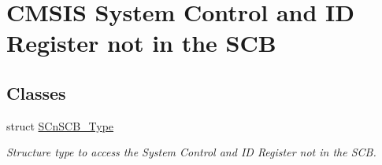 \hypertarget{group___c_m_s_i_s___s_cn_s_c_b}{\section{C\-M\-S\-I\-S System Control and I\-D Register not in the S\-C\-B}
\label{group___c_m_s_i_s___s_cn_s_c_b}
}
\subsection*{Classes}
\begin{DoxyCompactItemize}
\item 
struct \hyperlink{struct_s_cn_s_c_b___type}{S\-Cn\-S\-C\-B\-\_\-\-Type}
\begin{DoxyCompactList}\small\item\em Structure type to access the System Control and I\-D Register not in the S\-C\-B. \end{DoxyCompactList}\end{DoxyCompactItemize}
